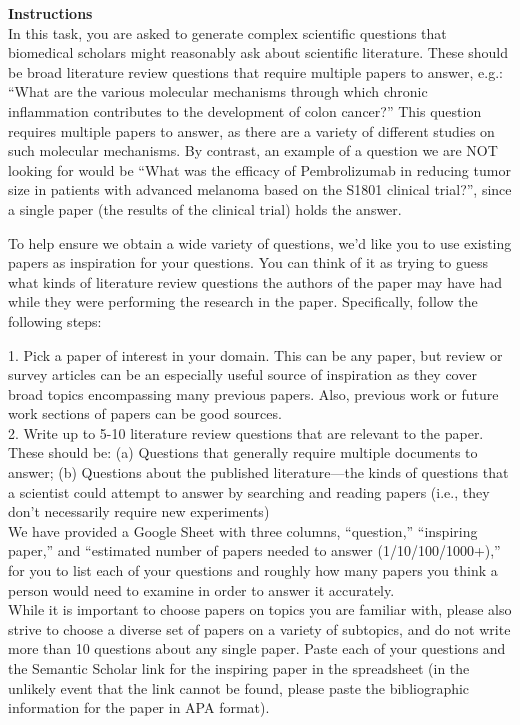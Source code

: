 \begin{table}[h!]
\begin{tcolorbox}
{\bf Instructions}\\ 

In this task, you are asked to generate complex scientific questions that biomedical scholars might reasonably ask about scientific literature.  These should be broad literature review questions that require multiple papers to answer, e.g.: ``What are the various molecular mechanisms through which chronic inflammation contributes to the development of colon cancer?''  This question requires multiple papers to answer, as there are a variety of different studies on such molecular mechanisms.  By contrast, an example of a question we are NOT looking for would be ``What was the efficacy of Pembrolizumab in reducing tumor size in patients with advanced melanoma based on the S1801 clinical trial?'', since a single paper (the results of the clinical trial) holds the answer.


To help ensure we obtain a wide variety of questions, we'd like you to use existing papers as inspiration for your questions.  You can think of it as trying to guess what kinds of literature review questions the authors of the paper may have had while they were performing the research in the paper.  Specifically, follow the following steps:


1. Pick a paper of interest in your domain.  This can be any paper, but review or survey articles can be an especially useful source of inspiration as they cover broad topics encompassing many previous papers.  Also, previous work or future work sections of papers can be good sources. \\
2. Write up to 5-10 literature review questions that are relevant to the paper.  These should be:
(a) Questions that generally require multiple documents to answer; (b) Questions about the published literature—the kinds of questions that a scientist could attempt to answer by searching and reading papers (i.e., they don’t necessarily require new experiments)
\\
We have provided a Google Sheet with three columns, ``question,'' ``inspiring paper,'' and ``estimated number of papers needed to answer (1/10/100/1000+),'' for you to list each of your questions and roughly how many papers you think a person would need to examine in order to answer it accurately.
\\

While it is important to choose papers on topics you are familiar with, please also strive to choose a diverse set of papers on a variety of subtopics, and do not write more than 10 questions about any single paper.  Paste each of your questions and the Semantic Scholar link for the inspiring paper in the spreadsheet (in the unlikely event that the link cannot be found, please paste the bibliographic information for the paper in APA format).


\end{tcolorbox}
\end{table}
